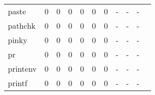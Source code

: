 \begin{longtable}{lp{1.20cm}p{1.20cm}p{1.20cm}p{1.20cm}p{1.20cm}p{1.20cm}p{1.20cm}p{1.20cm}p{1.20cm}p{1.20cm}}
paste     &                                     0 &                                                  0 &                                                  0 &                                                  0 &                                                  0 &                                                  0 &                                             - &                                                  - &                                                  - \\
pathchk   &                                     0 &                                                  0 &                                                  0 &                                                  0 &                                                  0 &                                                  0 &                                             - &                                                  - &                                                  - \\
pinky     &                                     0 &                                                  0 &                                                  0 &                                                  0 &                                                  0 &                                                  0 &                                             - &                                                  - &                                                  - \\
pr        &                                     0 &                                                  0 &                                                  0 &                                                  0 &                                                  0 &                                                  0 &                                             - &                                                  - &                                                  - \\
printenv  &                                     0 &                                                  0 &                                                  0 &                                                  0 &                                                  0 &                                                  0 &                                             - &                                                  - &                                                  - \\
printf    &                                     0 &                                                  0 &                                                  0 &                                                  0 &                                                  0 &                                                  0 &                                             - &                                                  - &                                                  - \\

\end{longtable}
